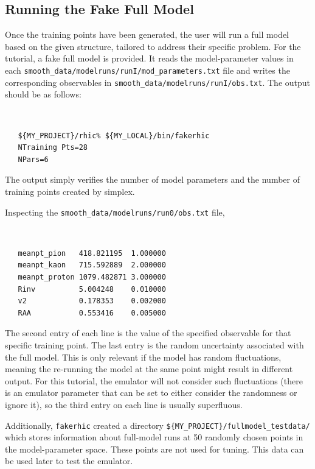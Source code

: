 \documentclass[UserManual.tex]{subfiles}
\begin{document}
\subsection{Running the Fake Full Model}
Once the training points have been generated, the user will run a full model based on the given structure, tailored to address their specific problem. For the tutorial, a fake full model is provided. It reads the model-parameter values in each {\tt smooth\_data/modelruns/runI/mod\_parameters.txt} file and writes the corresponding observables in {\tt smooth\_data/modelruns/runI/obs.txt}. The output should be as follows:
{\tt
\begin{verbatim}
   ${MY_PROJECT}/rhic% ${MY_LOCAL}/bin/fakerhic
   NTraining Pts=28
   NPars=6
\end{verbatim}
}
The output simply verifies the number of model parameters and the number of training points created by simplex.

Inspecting the {\tt smooth\_data/modelruns/run0/obs.txt} file,
{\tt
\begin{verbatim}
   meanpt_pion   418.821195  1.000000
   meanpt_kaon   715.592889  2.000000
   meanpt_proton 1079.482871 3.000000
   Rinv          5.004248    0.010000
   v2            0.178353    0.002000
   RAA           0.553416    0.005000
\end{verbatim}
}
The second entry of each line is the value of the specified observable for that specific training point. The last entry is the random uncertainty associated with the full model. This is only relevant if the model has random fluctuations, meaning the re-running the model at the same point might result in different output. For this tutorial, the emulator will not consider such fluctuations (there is an emulator parameter that can be set to either consider the randomness or ignore it), so the third entry on each line is usually superfluous. 

Additionally, {\tt fakerhic} created a directory {\tt \$\{MY\_PROJECT\}/fullmodel\_testdata/} which stores information about full-model runs at 50 randomly chosen points in the model-parameter space. These points are not used for tuning. This data can be used later to test the emulator. 
\end{document}
